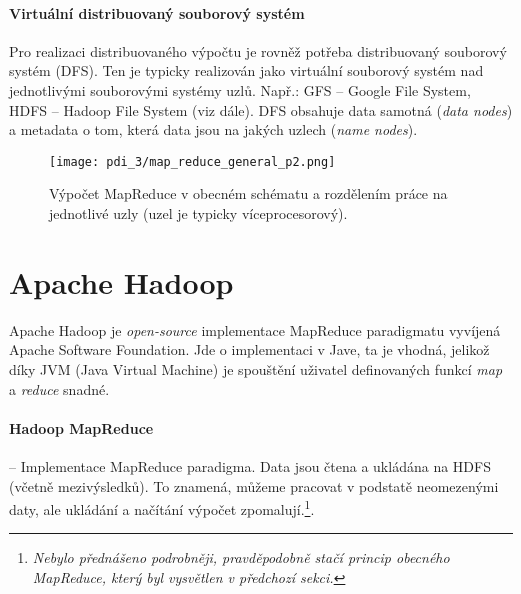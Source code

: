 \paragraph*{Virtuální distribuovaný souborový systém} Pro realizaci distribuovaného výpočtu je rovněž potřeba distribuovaný souborový systém (DFS). Ten je typicky realizován jako virtuální souborový systém nad jednotlivými souborovými systémy uzlů. Např.: GFS -- Google File System, HDFS -- Hadoop File System (viz dále). DFS obsahuje data samotná (\textit{data nodes}) a metadata o tom, která data jsou na jakých uzlech (\textit{name nodes}).

\begin{figure}[H]
    \centering
    \texttt{[image: pdi\_3/map\_reduce\_general\_p2.png]}
    \caption{Výpočet MapReduce v obecném schématu a rozdělením práce na jednotlivé uzly (uzel je typicky víceprocesorový).}
\end{figure}


\section{Apache Hadoop}


Apache Hadoop je \textit{open-source} implementace MapReduce paradigmatu vyvíjená Apache Software Foundation. Jde o implementaci v Jave, ta je vhodná, jelikož díky JVM (Java Virtual Machine) je spouštění uživatel definovaných funkcí \textit{map} a \textit{reduce} snadné.

\paragraph*{Hadoop MapReduce} -- Implementace MapReduce paradigma. Data jsou čtena a ukládána na HDFS (včetně mezivýsledků). To znamená, můžeme pracovat v podstatě neomezenými daty, ale ukládání a načítání výpočet zpomalují.\footnote{\textit{Nebylo přednášeno podrobněji, pravděpodobně stačí princip obecného MapReduce, který byl vysvětlen v předchozí sekci.}}.

